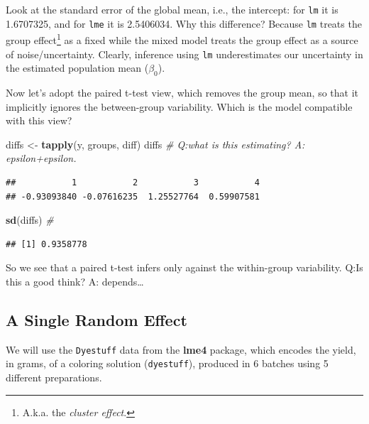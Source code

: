 \documentclass[]{book}
\newenvironment{Shaded}{\begin{snugshade}}{\end{snugshade}}
\newcommand{\CommentTok}[1]{\textcolor[rgb]{0.56,0.35,0.01}{\textit{#1}}}
\newcommand{\KeywordTok}[1]{\textcolor[rgb]{0.13,0.29,0.53}{\textbf{#1}}}
\newcommand{\NormalTok}[1]{#1}
\newcommand{\StringTok}[1]{\textcolor[rgb]{0.31,0.60,0.02}{#1}}
\theoremstyle{definition}
\theoremstyle{definition}
\theoremstyle{definition}
\theoremstyle{remark}
\begin{document}
Look at the standard error of the global mean, i.e., the intercept:
for \texttt{lm} it is 1.6707325, and for \texttt{lme} it is 2.5406034.
Why this difference?
Because \texttt{lm} treats the group effect\footnote{A.k.a. the \emph{cluster effect}.} as a fixed while the mixed model treats the group effect as a source of noise/uncertainty.
Clearly, inference using \texttt{lm} underestimates our uncertainty in the estimated population mean (\(\beta_0\)).

Now let's adopt the paired t-test view, which removes the group mean, so that it implicitly ignores the between-group variability. Which is the model compatible with this view?

\begin{Shaded}
\begin{Highlighting}[]
\NormalTok{diffs <-}\StringTok{ }\KeywordTok{tapply}\NormalTok{(y, groups, diff) }
\NormalTok{diffs }\CommentTok{# Q:what is this estimating? A: epsilon+epsilon.}
\end{Highlighting}
\end{Shaded}

\begin{verbatim}
##           1           2           3           4 
## -0.93093840 -0.07616235  1.25527764  0.59907581
\end{verbatim}

\begin{Shaded}
\begin{Highlighting}[]
\KeywordTok{sd}\NormalTok{(diffs) }\CommentTok{# }
\end{Highlighting}
\end{Shaded}

\begin{verbatim}
## [1] 0.9358778
\end{verbatim}

So we see that a paired t-test infers only against the within-group variability.
Q:Is this a good think?
A: depends\ldots{}

\hypertarget{a-single-random-effect}{%
\subsection{A Single Random Effect}\label{a-single-random-effect}}

We will use the \texttt{Dyestuff} data from the \textbf{lme4} package, which encodes the yield, in grams, of a coloring solution (\texttt{dyestuff}), produced in 6 batches using 5 different preparations.
\end{document}
